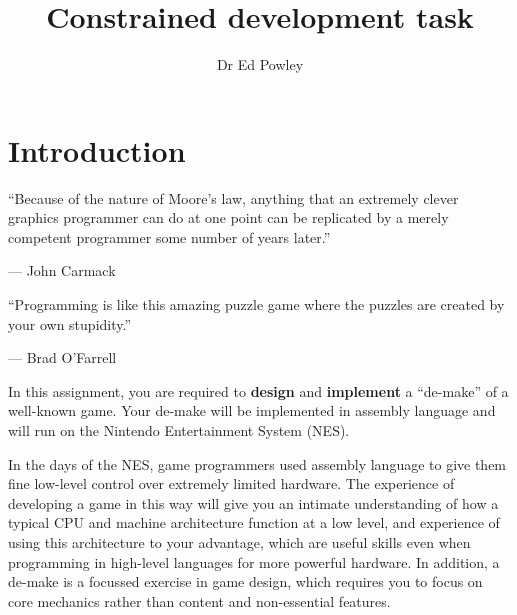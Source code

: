 \documentclass{../../fal_assignment}
\title{Constrained development task}
\author{Dr Ed Powley}
\begin{document}
\maketitle

\section*{Introduction}

\begin{marginquote}
``Because of the nature of Moore's law, anything that an extremely clever graphics programmer can do at one point can be replicated by a merely competent programmer some number of years later.''

--- John Carmack

    \marginquoterule

``Programming is like this amazing puzzle game where the puzzles are created by your own stupidity.''

--- Brad O'Farrell
\end{marginquote}

In this assignment, you are required to \textbf{design} and \textbf{implement} a ``de-make''
of a well-known game. Your de-make will be implemented in assembly language and will run on the 
Nintendo Entertainment System (NES).

In the days of the NES, game programmers used assembly language
to give them fine low-level control over extremely limited hardware.
The experience of developing a game in this way will give you an intimate understanding
of how a typical CPU and machine architecture function at a low level,
and experience of using this architecture to your advantage,
which are useful skills even when programming in high-level languages for more powerful hardware.
In addition, a de-make is a focussed exercise in game design,
which requires you to focus on core mechanics rather than content and non-essential features.
\end{document}
